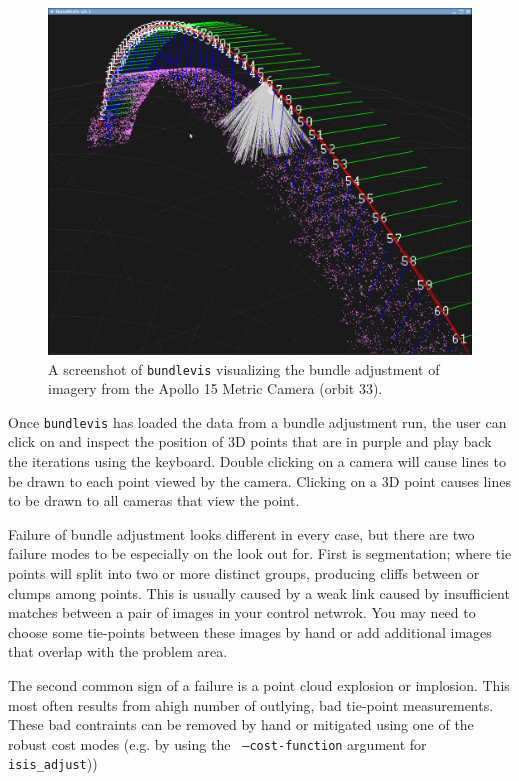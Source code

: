 \begin{figure}[htp]
  \begin{center}
  \includegraphics[width=5in]{images/bundlevis_apollo.png}
  \end{center}
  \caption{ A screenshot of {\tt bundlevis} visualizing the bundle
    adjustment of imagery from the Apollo 15 Metric Camera (orbit
    33). }
  \label{fig:bundlevis}
\end{figure}

Once {\tt bundlevis} has loaded the data from a bundle adjustment run,
the user can click on and inspect the position of 3D points that are
in purple and play back the iterations using the keyboard. Double
clicking on a camera will cause lines to be drawn to each point viewed
by the camera. Clicking on a 3D point causes lines to be drawn to all
cameras that view the point.

Failure of bundle adjustment looks different in every case, but there
are two failure modes to be especially on the look out for. First is
segmentation; where tie points will split into two or more distinct
groups, producing cliffs between or clumps among points. This is
usually caused by a weak link caused by insufficient matches between a
pair of images in your control netwrok.  You may need to choose some
tie-points between these images by hand or add additional images that
overlap with the problem area.

The second common sign of a failure is a point cloud explosion or
implosion. This most often results from ahigh number of outlying, bad
tie-point measurements. These bad contraints can be removed by hand or
mitigated using one of the robust cost modes (e.g. by using the {\tt
  --cost-function} argument for {\tt isis\_adjust}))

